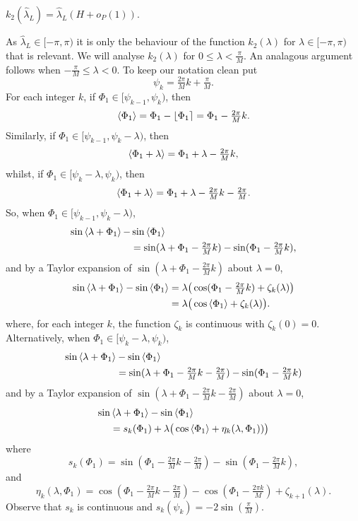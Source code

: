 \documentclass[journal]{IEEEtran}
\begin{document}
\begin{lemma}\label{lem:k2conv}
$k_2(\hat{\lambda}_L) = \hat{\lambda}_L ( H + o_P(1) ).$
\end{lemma}
\begin{IEEEproof}
As $\hat{\lambda}_L \in [-\pi, \pi)$ it is only the behaviour of the function $k_2(\lambda)$ for $\lambda\in [-\pi, \pi)$ that is relevant.  We will analyse $k_2(\lambda)$ for $0 \leq \lambda < \tfrac{\pi}{M}$.  An analagous argument follows when $-\tfrac{\pi}{M} \leq \lambda < 0$.  To keep our notation clean put
\[
\psi_k = \tfrac{2\pi}{M}k + \tfrac{\pi}{M}.
\]
For each integer $k$, if $\Phi_1 \in [\psi_{k-1}, \psi_k)$, then
\[
\left\langle \Phi_1 \right\rangle = \Phi_1 - {\left\lfloor \Phi_1 \right\rceil} = \Phi_1 - \tfrac{2\pi}{M}k.
\]
Similarly, if $\Phi_1 \in  [\psi_{k-1}, \psi_{k} - \lambda)$, then
\[
\left\langle \Phi_1 + \lambda \right\rangle = \Phi_1 + \lambda - \tfrac{2\pi}{M}k,
\]
whilst, if $\Phi_1 \in [\psi_{k} - \lambda, \psi_{k})$, then
\[
\left\langle \Phi_1 + \lambda \right\rangle = \Phi_1 + \lambda - \tfrac{2\pi}{M}k - \tfrac{2\pi}{M}.
\]
So, when $\Phi_1 \in [\psi_{k-1}, \psi_{k} - \lambda )$,
\begin{align*}
\sin\left\langle \lambda + \Phi_1 \right\rangle - &\sin\left\langle \Phi_1 \right\rangle \\
&= \sin(\lambda + \Phi_1 - \tfrac{2\pi}{M}k) - \sin(\Phi_1 - \tfrac{2\pi}{M}k),
\end{align*}
and by a Taylor expansion of $\sin(\lambda + \Phi_1 - \tfrac{2\pi}{M}k)$ about $\lambda = 0$, 
\begin{align*}
\sin\left\langle \lambda + \Phi_1 \right\rangle - \sin\left\langle \Phi_1 \right\rangle &= \lambda\big(\cos(\Phi_1 - \tfrac{2\pi}{M}k) + \zeta_k(\lambda)\big) \\
&= \lambda\big(\cos\left\langle \Phi_1 \right\rangle + \zeta_k(\lambda)\big).
\end{align*}
where, for each integer $k$, the function $\zeta_k$ is continuous with $\zeta_k(0) = 0$.  Alternatively, when $\Phi_1 \in [ \psi_{k} - \lambda,\psi_{k})$,
\begin{align*}
\sin\left\langle \lambda + \Phi_1 \right\rangle &- \sin\left\langle \Phi_1 \right\rangle \\
&= \sin(\lambda + \Phi_1 - \tfrac{2\pi}{M}k - \tfrac{2\pi}{M}) - \sin(\Phi_1 - \tfrac{2\pi}{M}k)
\end{align*}
and by a Taylor expansion of $\sin(\lambda + \Phi_1 - \tfrac{2\pi}{M}k - \tfrac{2\pi}{M})$ about $\lambda = 0$,
\begin{align*}
\sin&\left\langle \lambda + \Phi_1 \right\rangle - \sin\left\langle \Phi_1 \right\rangle \\
&= s_k(\Phi_1) + \lambda\big(\cos\left\langle \Phi_1 \right\rangle + \eta_k(\lambda, \Phi_1)  )\big)
\end{align*}
where
\[
s_k(\Phi_1) = \sin(\Phi_1 - \tfrac{2\pi}{M}k - \tfrac{2\pi}{M}) - \sin(\Phi_1 - \tfrac{2\pi}{M}k),
\]
and
\[
\eta_k(\lambda, \Phi_1) = \cos(\Phi_1 - \tfrac{2\pi}{M}k - \tfrac{2\pi}{M}) - \cos(\Phi_1 - \tfrac{2\pi k}{M}) + \zeta_{k+1}(\lambda).
\]
Observe that $s_k$ is continuous and $s_k(\psi_{k}) = -2\sin(\tfrac{\pi}{M})$.


\end{IEEEproof}
\end{document}
